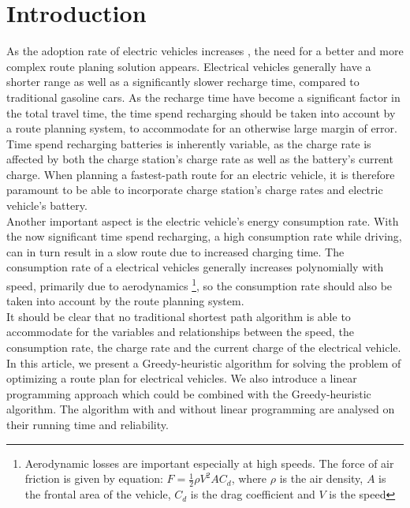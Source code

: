 \section{Introduction}

As the adoption rate of electric vehicles increases \cite{ev-sales-increasing}, the need for a better and more complex route planing solution appears. Electrical vehicles generally have a shorter range as well as a significantly slower recharge time, compared to traditional gasoline cars. As the recharge time have become a significant factor in the total travel time, the time spend recharging should be taken into account by a route planning system, to accommodate for an otherwise large margin of error. Time spend recharging batteries is inherently variable, as the charge rate is affected by both the charge station's charge rate as well as the battery's current charge. When planning a fastest-path route for an electric vehicle, it is therefore paramount to be able to incorporate charge station's charge rates and electric vehicle's battery.\\

Another important aspect is the electric vehicle's energy consumption rate. With the now significant time spend recharging, a high consumption rate while driving, can in turn result in a slow route due to increased charging time. The consumption rate of a electrical vehicles generally increases polynomially with speed, primarily due to aerodynamics \footnote{Aerodynamic losses are important especially at high speeds. The force of air friction is given by equation: $F = \frac{1}{2} \rho V^2 A C_d$, where $\rho$ is the air density, $A$ is the frontal area of the vehicle, $C_d$ is the drag coefficient and $V$ is the speed}, so the consumption rate should also be taken into account by the route planning system.\\

It should be clear that no traditional shortest path algorithm is able to accommodate for the variables and relationships between the speed, the consumption rate, the charge rate and the current charge of the electrical vehicle. In this article, we present a Greedy-heuristic algorithm for solving the problem of optimizing a route plan for electrical vehicles. We also introduce a linear programming approach which could be combined with the Greedy-heuristic algorithm. The algorithm with and without linear programming are analysed on their running time and reliability.




